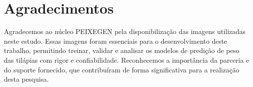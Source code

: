 \documentclass[sigconf,nonacm,screen]{acmart}
\begin{document}
\section*{Agradecimentos}

\indent Agradecemos ao núcleo PEIXEGEN pela disponibilização das imagens utilizadas neste estudo.  
Essas imagens foram essenciais para o desenvolvimento deste trabalho, permitindo treinar, validar e analisar os modelos de predição de peso das tilápias com rigor e confiabilidade.  
Reconhecemos a importância da parceria e do suporte fornecido, que contribuíram de forma significativa para a realização desta pesquisa.


\end{document}
